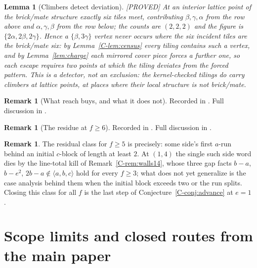 \documentclass[11pt,reqno]{amsart}
\theoremstyle{plain}
\newtheorem{lemma}[theorem]{Lemma}
\theoremstyle{definition}
\newtheorem{remark}[theorem]{Remark}
\newcommand{\lab}[1]{\hfill\textnormal{\footnotesize\textsc{[#1]}}}
\begin{document}
\begin{lemma}[Climbers detect deviation]\label{lem:climberdetect}\lab{PROVED}
At an interior lattice point of the brick/mate structure exactly six tiles meet, contributing
$\beta,\gamma,\alpha$ from the row above and $\alpha,\gamma,\beta$ from the row below; the counts
are $(2,2,2)$ and the figure is $\{2\alpha,2\beta,2\gamma\}$. Hence a $\{\beta,3\gamma\}$ vertex
never occurs where the six incident tiles are the brick/mate six: by Lemma~\ref{C-lem:census} every
tiling contains such a vertex, and by Lemma~\ref{lem:charge} each mirrored cover piece forces a
further one, so each escape requires two points at which the tiling deviates from the forced
pattern. This is a detector, not an exclusion: the kernel-checked tilings do carry climbers at
lattice points, at places where their local structure is not brick/mate.
\end{lemma}

\begin{remark}[What reach buys, and what it does not]\label{rem:reachlaw}
Recorded in \cite{Obstructions}. Full discussion in \cite{Obstructions}.
\end{remark}

\begin{remark}[The residue at $f\ge6$]\label{rem:f6residue}
Recorded in \cite{Obstructions}. Full discussion in \cite{Obstructions}.
\end{remark}

\begin{remark}\label{rem:e1residual}
The residual class for $f\ge5$ is precisely: some side's first $a$-run behind an initial $c$-block
of length at least $2$. At $(1,4)$ the single such side word dies by the line-total kill of
Remark~\ref{C-rem:walls14}, whose three gap facts $b-a$, $b-e^2$, $2b-a\notin\langle a,b,c\rangle$
hold for every $f\ge3$; what does not yet generalize is the case analysis behind them when the
initial block exceeds two or the run splits. Closing this class for all $f$ is the last step of
Conjecture~\ref{C-conj:advance} at $e=1$.
\end{remark}

\section{Scope limits and closed routes from the main paper}\label{sec:mainscope}
\end{document}
